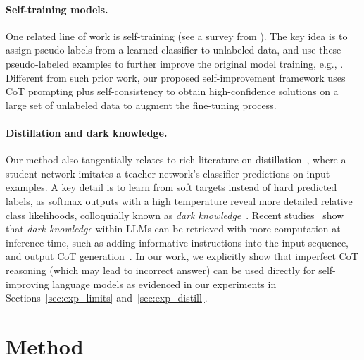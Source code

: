 \documentclass{article} %
\begin{document}
\paragraph{Self-training models.}
One related line of work is self-training (see a survey from \citet{self-training-survey}). The key idea is to assign pseudo labels from a learned classifier to unlabeled data, and use these pseudo-labeled examples to further improve the original model training, e.g., \citep{DBLP:conf/cvpr/RoyChowdhuryCSJ19,self_training_xie,He2020Revisiting,chen2021-CPS}.
Different from such prior work, our proposed self-improvement framework uses CoT prompting plus self-consistency to obtain high-confidence solutions on a large set of unlabeled data to augment the fine-tuning process. 

\paragraph{Distillation and dark knowledge.} Our method also tangentially relates to rich literature on distillation~\citep{ba2014deep,hinton2015distilling}, where a student network imitates a teacher network's classifier predictions on input examples. A key detail is to learn from soft targets instead of hard predicted labels, as softmax outputs with a high temperature reveal more detailed relative class likelihoods, colloquially known as \textit{dark knowledge}~\citep{hinton2015distilling,korattikara2015bayesian}. Recent studies~\citep{star,snell2022learning,eisenstein2022honest} show that \textit{dark knowledge} within LLMs can be retrieved with more computation at inference time, such as adding informative instructions into the input sequence, and output CoT generation~\citep{Wei2022ChainOT,step_by_step}. In our work, we explicitly show that imperfect CoT reasoning (which may lead to incorrect answer) can be used directly for self-improving language models as evidenced in our experiments in Sections~\ref{sec:exp_limits} and~\ref{sec:exp_distill}.



\section{Method}
\label{sec:method}
\end{document}
